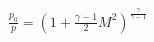 \documentclass[10pt]{article}
\begin{document}
\begin{align*}\frac{p_{0}}{p}
=
\left(
1+\frac{\gamma-1}{2} M^2
\right)^{\frac{\gamma}{\gamma-1}}\end{align*}
\end{document}
